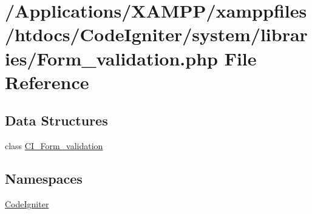 \hypertarget{_form__validation_8php}{}\section{/\+Applications/\+X\+A\+M\+P\+P/xamppfiles/htdocs/\+Code\+Igniter/system/libraries/\+Form\+\_\+validation.php File Reference}
\label{_form__validation_8php}
\subsection*{Data Structures}
\begin{DoxyCompactItemize}
\item 
class \mbox{\hyperlink{class_c_i___form__validation}{C\+I\+\_\+\+Form\+\_\+validation}}
\end{DoxyCompactItemize}
\subsection*{Namespaces}
\begin{DoxyCompactItemize}
\item 
 \mbox{\hyperlink{namespace_code_igniter}{Code\+Igniter}}
\end{DoxyCompactItemize}
